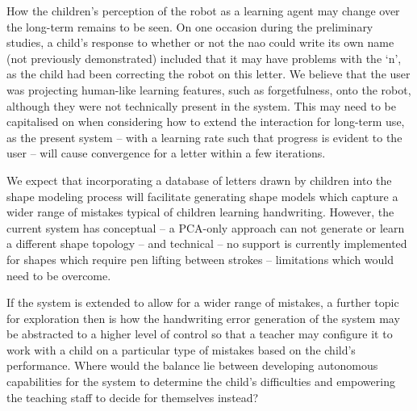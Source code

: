 \documentclass{sig-alternate}
\begin{document}

How the children's perception of the robot as a learning agent may change over the 
long-term remains to be seen. On one occasion during the preliminary studies, a 
child's response to whether or not the {\sc nao} could write its own name (not
previously demonstrated) included that it 
may have problems with the `n', as the child had been correcting the robot on this 
letter. We believe that the user was projecting human-like learning features, such as 
forgetfulness, onto the robot, although they were not technically present in the system.
This may need to be capitalised on when considering how to 
extend the interaction for long-term use, as the present system -- with a learning rate 
such that progress is evident to the user -- will cause convergence for a letter within a 
few iterations.

We expect that incorporating a
database of letters drawn by children into the shape modeling process will
facilitate generating shape models which capture a wider range of mistakes typical
of children learning handwriting. However, the current system has conceptual -- 
a PCA-only approach can not generate or learn a different shape topology -- and 
technical -- no support is currently implemented for shapes which require pen
lifting between strokes -- limitations which would need to be overcome.

If the system is extended to allow for a wider range of mistakes, a further 
topic for exploration then is how the handwriting error
generation of the system may be abstracted to a higher level of control so that
a teacher may configure it to work with a child on a particular type of
mistakes based on the child's performance. Where would the balance lie between
developing autonomous capabilities for the system to determine the child's
difficulties and empowering the teaching staff to decide for themselves
instead? 
\end{document}
